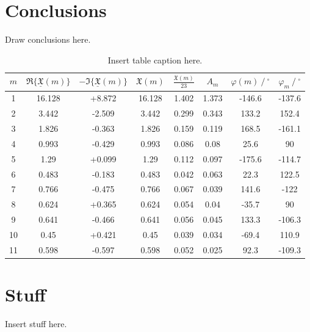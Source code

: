 \documentclass[sotoncolour]{uosarticle}
\begin{document}
\section{Conclusions} \label{sec:Conclusions}
Draw conclusions here.
\blindtext[4]
\begin{table}
\begin{tabular}{c|c|c|c|c|c|c|c}
    {$m$} & {$\Re\{\underline{\mathfrak{X}}(m)\}$} & {$-\Im\{\underline{\mathfrak{X}}(m)\}$} & {$\mathfrak{X}(m)$} & {$\frac{\mathfrak{X}(m)}{23}$} & {$A_m$} & {$\varphi(m)\ /\ ^{\circ}$} & {$\varphi_m\ /\ ^{\circ}$} \\ \toprule
    1  & 16.128 & +8.872 & 16.128 & 1.402 & 1.373 & -146.6 & -137.6 \\
    2  & 3.442  & -2.509 & 3.442  & 0.299 & 0.343 & 133.2  & 152.4  \\
    3  & 1.826  & -0.363 & 1.826  & 0.159 & 0.119 & 168.5  & -161.1 \\
    4  & 0.993  & -0.429 & 0.993  & 0.086 & 0.08  & 25.6   & 90     \\
    5  & 1.29   & +0.099 & 1.29   & 0.112 & 0.097 & -175.6 & -114.7 \\
    6  & 0.483  & -0.183 & 0.483  & 0.042 & 0.063 & 22.3   & 122.5  \\
    7  & 0.766  & -0.475 & 0.766  & 0.067 & 0.039 & 141.6  & -122   \\
    8  & 0.624  & +0.365 & 0.624  & 0.054 & 0.04  & -35.7  & 90     \\
    9  & 0.641  & -0.466 & 0.641  & 0.056 & 0.045 & 133.3  & -106.3 \\
    10 & 0.45   & +0.421 & 0.45   & 0.039 & 0.034 & -69.4  & 110.9  \\
    11 & 0.598  & -0.597 & 0.598  & 0.052 & 0.025 & 92.3   & -109.3 \\
\end{tabular}
\caption{\label{tbl:test}Insert table caption here.}
\end{table}

\blindtext[3]


\backmatter
\appendix


\section{Stuff} \label{Section:Stuff}
Insert stuff here.
\end{document}
